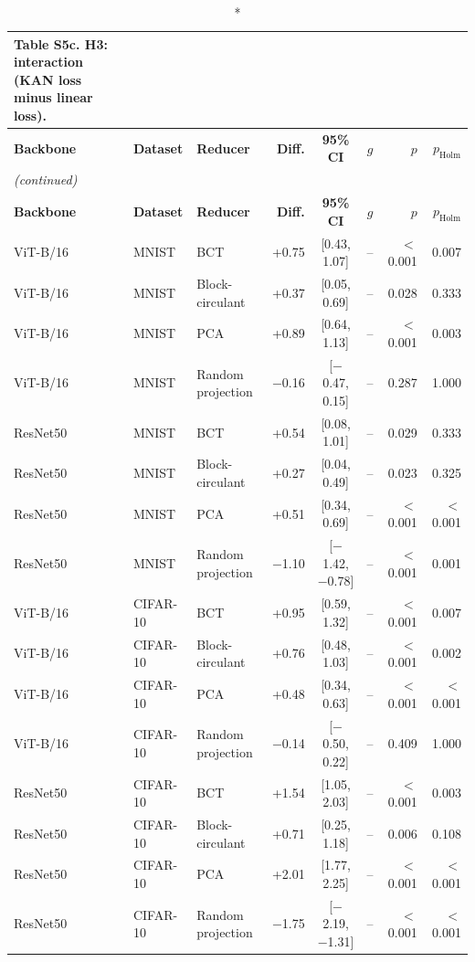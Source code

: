 \documentclass[10pt]{article}
\begin{document}
\scriptsize
\setlength{\tabcolsep}{3pt}
\begin{longtable}{lllrcrrr}
\caption*{\textbf{Table S5c.} H3: interaction (KAN loss minus linear loss).}\\
\toprule
\textbf{Backbone} & \textbf{Dataset} & \textbf{Reducer} & \textbf{Diff.} & \textbf{95\% CI} & \textbf{$g$} & \textbf{$p$} & \textbf{$p_{\mathrm{Holm}}$} \\
\midrule
\endfirsthead
\multicolumn{8}{l}{\textit{(continued)}}\\
\toprule
\textbf{Backbone} & \textbf{Dataset} & \textbf{Reducer} & \textbf{Diff.} & \textbf{95\% CI} & \textbf{$g$} & \textbf{$p$} & \textbf{$p_{\mathrm{Holm}}$} \\
\midrule
\endhead
\bottomrule
\endfoot
ViT-B/16 & MNIST & BCT & +0.75 & [0.43, 1.07] & -- & $<$0.001 & 0.007 \\
ViT-B/16 & MNIST & Block-circulant & +0.37 & [0.05, 0.69] & -- & 0.028 & 0.333 \\
ViT-B/16 & MNIST & PCA & +0.89 & [0.64, 1.13] & -- & $<$0.001 & 0.003 \\
ViT-B/16 & MNIST & Random projection & $-$0.16 & [$-$0.47, 0.15] & -- & 0.287 & 1.000 \\
ResNet50 & MNIST & BCT & +0.54 & [0.08, 1.01] & -- & 0.029 & 0.333 \\
ResNet50 & MNIST & Block-circulant & +0.27 & [0.04, 0.49] & -- & 0.023 & 0.325 \\
ResNet50 & MNIST & PCA & +0.51 & [0.34, 0.69] & -- & $<$0.001 & $<$0.001 \\
ResNet50 & MNIST & Random projection & $-$1.10 & [$-$1.42, $-$0.78] & -- & $<$0.001 & 0.001 \\
ViT-B/16 & CIFAR-10 & BCT & +0.95 & [0.59, 1.32] & -- & $<$0.001 & 0.007 \\
ViT-B/16 & CIFAR-10 & Block-circulant & +0.76 & [0.48, 1.03] & -- & $<$0.001 & 0.002 \\
ViT-B/16 & CIFAR-10 & PCA & +0.48 & [0.34, 0.63] & -- & $<$0.001 & $<$0.001 \\
ViT-B/16 & CIFAR-10 & Random projection & $-$0.14 & [$-$0.50, 0.22] & -- & 0.409 & 1.000 \\
ResNet50 & CIFAR-10 & BCT & +1.54 & [1.05, 2.03] & -- & $<$0.001 & 0.003 \\
ResNet50 & CIFAR-10 & Block-circulant & +0.71 & [0.25, 1.18] & -- & 0.006 & 0.108 \\
ResNet50 & CIFAR-10 & PCA & +2.01 & [1.77, 2.25] & -- & $<$0.001 & $<$0.001 \\
ResNet50 & CIFAR-10 & Random projection & $-$1.75 & [$-$2.19, $-$1.31] & -- & $<$0.001 & $<$0.001 \\

\end{longtable}
\end{document}
